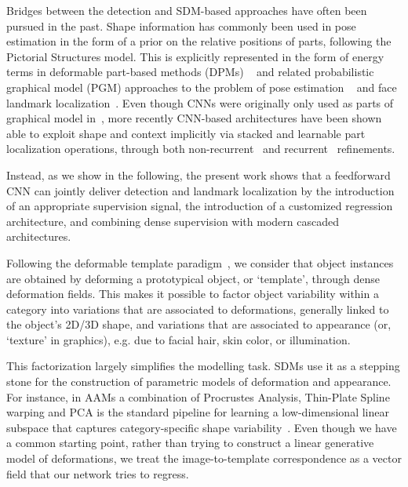 Bridges between the detection and SDM-based approaches have often been pursued in the past.
Shape information has commonly been used in pose estimation in the form of a prior on the relative positions of parts, following the Pictorial Structures model\cite{fischler1973representation}. This is explicitly represented in the form of energy terms in deformable part-based methods
(DPMs) ~\cite{felzenszwalb2008discriminatively} and related probabilistic graphical model (PGM) approaches to the problem of pose estimation ~\cite{andriluka2009pictorial,sapp2010adaptive,yang2011articulated,sapp2013modec} and face landmark localization~\cite{zhu2012face}. Even though CNNs were originally only used as parts of graphical model in~\cite{jain2013learning,tompson2014joint,chen2014articulated,yang2016end},  more recently CNN-based architectures have been shown able to exploit shape and context implicitly via  stacked and  learnable part localization operations, through both non-recurrent~\cite{wei2016convolutional,bulat2016human,newell2016stacked} and recurrent~\cite{belagiannis2016recurrent} refinements. 

Instead, as we show in the following,  the present work shows that a feedforward CNN can jointly deliver detection and landmark localization by the introduction of an appropriate supervision signal, the introduction of a customized regression architecture, and combining dense supervision with modern cascaded architectures. 

Following the deformable template paradigm~\cite{yuille1991deformable,Grenander1991}, we consider that object instances are obtained by deforming a prototypical object, or `template', through  dense deformation fields. 
This makes it possible  to factor  object variability within a category into variations that are associated to  deformations, generally linked to the object's 2D/3D shape, and variations that are associated to appearance (or, `texture' in graphics), e.g. due to facial hair, skin color, or illumination. 

This factorization largely simplifies the  modelling task. SDMs use it as a stepping stone for the construction of parametric models of deformation and appearance. For instance, in AAMs a combination of Procrustes Analysis, Thin-Plate Spline warping and PCA is the standard pipeline for learning a low-dimensional linear subspace that captures category-specific shape variability~\cite{cootes2001active}. Even though we have a common starting point, rather than trying to construct a linear generative model of deformations, we treat the image-to-template correspondence as a vector field that our network tries to regress.

